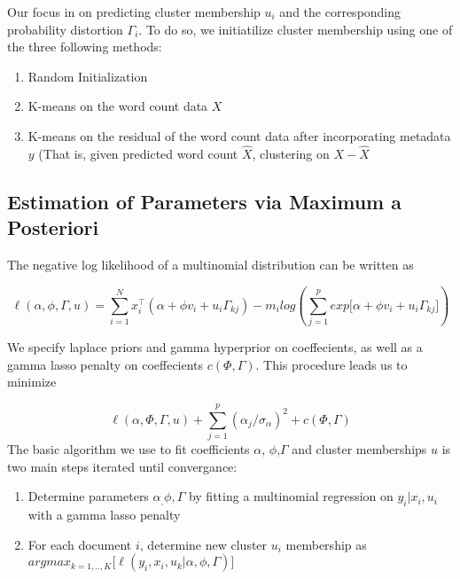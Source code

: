\documentclass[12pt]{article}
\begin{document}
Our focus in on predicting cluster membership $u_i$ and the
corresponding probability distortion $\Gamma_i$. To do so, we
initiatilize cluster membership using one of the three following
methods:

\begin{enumerate}
\def\labelenumi{\arabic{enumi}.}
\itemsep1pt\parskip0pt
\item
  Random Initialization
\item
  K-means on the word count data $X$
\item
  K-means on the residual of the word count data after incorporating
  metadata $y$ (That is, given predicted word count $\hat{X}$,
  clustering on $X-\hat{X}$
\end{enumerate}

\subsection{Estimation of Parameters via Maximum a
Posteriori}\label{estimation-of-parameters-via-maximum-a-posteriori}

The negative log likelihood of a multinomial distribution can be written
as

\begin{equation} 
\ell(\alpha,\phi,\Gamma,u) = \sum_{i = 1}^{N}{ x_i^\top (\alpha + \phi v_i + u_i \Gamma_{kj})} - m_i log(\sum_{j = 1}^{p}{exp{\big[ \alpha + \phi v_i + u_i \Gamma_{kj} \big]}})
\end{equation}

We specify laplace priors and gamma hyperprior on coeffecients, as well
as a gamma lasso penalty on coeffecients $c(\Phi,\Gamma)$. This
procedure leads us to minimize

\begin{equation}
\ell(\alpha,\Phi,\Gamma,u) + \sum_{j=1}^{p}(\alpha_j/ \sigma_\alpha)^2 + c(\Phi,\Gamma) 
\end{equation}
The basic algorithm we use to fit coefficients $\alpha$, $\phi$,$\Gamma$
and cluster memberships $u$ is two main steps iterated until
convergance:

\begin{enumerate}
\def\labelenumi{\arabic{enumi}.}
\item
  Determine parameters $\alpha_, \phi, \Gamma$ by fitting a multinomial
  regression on $y_i | x_i , u_i$ with a gamma lasso penalty
\item
  For each document $i$, determine new cluster $u_i$ membership as \\
  $argmax_{k = 1,..,K} \big[  \ell(y_i,x_i,u_k | \alpha, \phi, \Gamma) \big]$
\end{enumerate}
\end{document}
